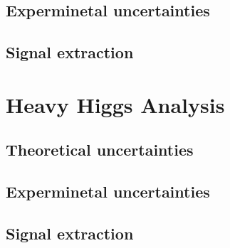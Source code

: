 \subsection{Experminetal uncertainties}
\label{exp_uncert}

\subsection{Signal extraction}
\label{sig_ext}


\section{Heavy Higgs Analysis}
\label{hh_sys}

\subsection{Theoretical uncertainties}
\label{theo_uncert}

\subsection{Experminetal uncertainties}
\label{exp_uncert}

\subsection{Signal extraction}
\label{sig_ext}

%
% 
% 


